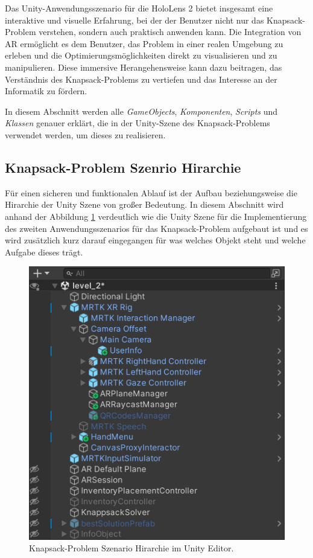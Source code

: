Das Unity-Anwendungsszenario für die HoloLens 2 bietet insgesamt eine interaktive und visuelle Erfahrung, bei der der
Benutzer nicht nur das Knapsack-Problem verstehen, sondern auch praktisch anwenden kann. Die Integration von AR ermöglicht
es dem Benutzer, das Problem in einer realen Umgebung zu erleben und die Optimierungsmöglichkeiten direkt zu visualisieren
und zu manipulieren. Diese immersive Herangehensweise kann dazu beitragen, das Verständnis des Knapsack-Problems zu vertiefen
und das Interesse an der Informatik zu fördern.

In diesem Abschnitt werden alle \textit{GameObjects}, \textit{Komponenten}, \textit{Scripts} und \textit{Klassen} genauer
erklärt, die in der Unity-Szene des Knapsack-Problems verwendet werden, um dieses zu realisieren.

\subsection{Knapsack-Problem Szenrio Hirarchie} 
Für einen sicheren und funktionalen Ablauf ist der Aufbau beziehungsweise die Hirarchie der Unity Szene von großer Bedeutung.
In diesem Abschnitt wird anhand der Abbildung \ref{fig:level2_hierarchy} verdeutlich wie die Unity Szene für die Implementierung
des zweiten Anwendungsszenarios für das Knapsack-Problem aufgebaut ist und es wird zusätzlich kurz darauf eingegangen
für was welches Objekt steht und welche Aufgabe dieses trägt.
\\
\begin{figure}[H]
    \centering
    \includegraphics[scale=0.8]{images/Level2Hirarchy}
    \caption{Knapsack-Problem Szenario Hirarchie im Unity Editor.}
    \label{fig:level2_hierarchy}
\end{figure}
